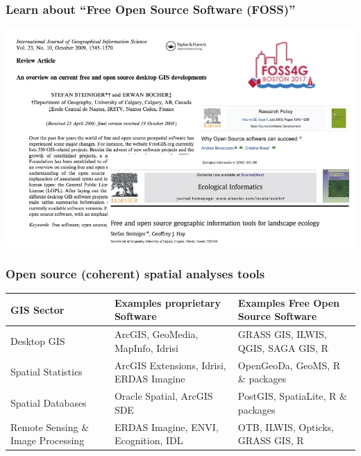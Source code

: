 \documentclass{beamer}
\begin{document}
\begin{frame}
\frametitle{Learn about ``Free Open Source Software (FOSS)''}
\centering
\includegraphics[width=\textwidth]{Figures/FOSS_articles.png}
\end{frame}


\begin{frame}
\frametitle{Open source (coherent) spatial analyses tools}
\centering
\begin{table}[h]
\begin{tabular}{p{3.0cm} p{4.0cm} p{4.0cm}}

\toprule

GIS Sector & Examples proprietary Software & Examples Free Open Source Software\\

\midrule

Desktop GIS & ArcGIS, GeoMedia, MapInfo, Idrisi & GRASS GIS, ILWIS, QGIS, SAGA GIS, \alert{R}\\[0.2cm]
Spatial Statistics & ArcGIS Extensions, Idrisi, ERDAS Imagine & OpenGeoDa, GeoMS, \alert{R \& packages} \\[0.2cm]
Spatial Databases & Oracle Spatial, ArcGIS SDE & PostGIS, SpatiaLite, \alert{R \& packages}\\[0.2cm]
Remote Sensing \& Image Processing & ERDAS Imagine, ENVI, Ecognition, IDL & OTB, ILWIS, Opticks, GRASS GIS, \alert{R}\\

\bottomrule

\end{tabular}
\end{table}
\end{frame}
\end{document}
